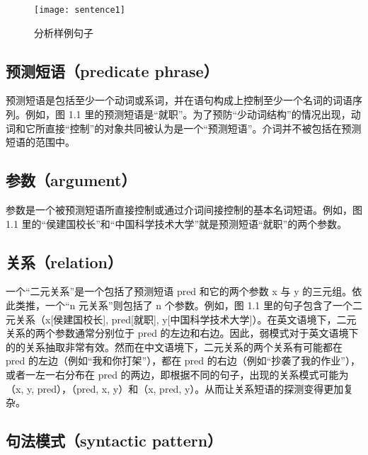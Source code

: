 \begin{figure}[ht]
\centering
\texttt{[image: sentence1]}
\caption{分析样例句子}\label{fig:sentence1}
\end{figure}

\subsection{预测短语（predicate phrase）}
预测短语是包括至少一个动词或系词，并在语句构成上控制至少一个名词的词语序列。例如，图 1.1 里的预测短语是“就职”。为了预防“少动词结构”的情况出现，动词和它所直接“控制”的对象共同被认为是一个“预测短语”。介词并不被包括在预测短语的范围中。

\subsection{参数（argument）}
参数是一个被预测短语所直接控制或通过介词间接控制的基本名词短语。例如，图 1.1 里的“侯建国校长”和“中国科学技术大学”就是预测短语“就职”的两个参数。

\subsection{关系（relation）}
一个“二元关系”是一个包括了预测短语 pred 和它的两个参数 x 与 y 的三元组。依此类推，一个“n 元关系”则包括了 n 个参数。例如，图 1.1 里的句子包含了一个二元关系（x[侯建国校长], pred[就职], y[中国科学技术大学]）。在英文语境下，二元关系的两个参数通常分别位于 pred 的左边和右边。因此，弱模式对于英文语境下的的关系抽取非常有效。然而在中文语境下，二元关系的两个关系有可能都在 pred 的左边（例如“我和你打架”），都在 pred 的右边（例如“抄袭了我的作业”），或者一左一右分布在 pred 的两边，即根据不同的句子，出现的关系模式可能为（x, y, pred），（pred, x, y）和（x, pred, y）。从而让关系短语的探测变得更加复杂。

\subsection{句法模式（syntactic pattern）}
